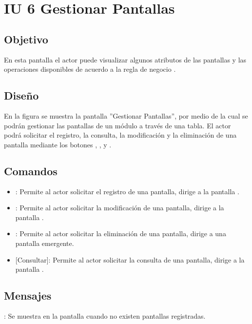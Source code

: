 \section{IU 6 Gestionar Pantallas}

\subsection{Objetivo}
	En esta pantalla el actor puede visualizar algunos atributos de las pantallas y las operaciones disponibles de acuerdo a la regla de negocio .
\subsection{Diseño}
	En la figura  se muestra la pantalla ''Gestionar Pantallas'', por medio de la cual se podrán gestionar las pantallas de un módulo a través de una tabla. El actor podrá solicitar el registro, la consulta, la modificación y la eliminación de una pantalla mediante los botones , , \editar y \eliminar.

\subsection{Comandos}
\begin{itemize}
	\item {}: Permite al actor solicitar el registro de una pantalla, dirige a la pantalla .
	\item \editar [Modificar]: Permite al actor solicitar la modificación de una pantalla, dirige a la pantalla .
	\item \eliminar [Eliminar]: Permite al actor solicitar la eliminación de una pantalla, dirige a una pantalla emergente.
	\item {} [Consultar]: Permite al actor solicitar la consulta de una pantalla, dirige a la pantalla  .
\end{itemize}
\subsection{Mensajes}

\begin{Citemize}
	\item {}: Se muestra en la pantalla  cuando no existen pantallas registradas.
\end{Citemize}
